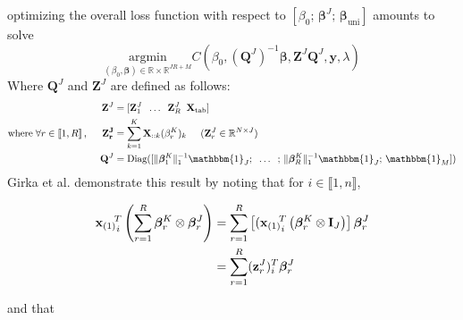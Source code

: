 \documentclass[10pt]{article}
\begin{document}
\noindent optimizing the overall loss function with respect to $\left[ \beta_0;\, \bm{\beta}^J ;\, \bm{\beta}_{\text{uni}}  \right]$ amounts to solve
\begin{equation}
    \underset{(\beta_0, \bm{\beta}) \in \mathbb{R} \times \mathbb{R}^{JR + M}}{\text{argmin}}  C(\beta_0, (\mathbf{Q}^J)^{-1}\bm{\beta},\mathbf{Z}^J \mathbf{Q}^J, \mathbf{y}, \lambda)
\end{equation}
\noindent Where $\mathbf{Q}^J$ and $\mathbf{Z}^J$ are defined as follows:
\begin{align}
    \mathbf{Z}^J                                                                               & = [\mathbf{Z}_1^J \; \; \hdots \; \; \mathbf{Z}_R^J \; \;  \mathbf{X}_{\text{tab}}]                                                                             \\
    \text{where} \; \forall r \in \llbracket 1, R\rrbracket\, , \hspace{0.5 cm} \mathbf{Z_r^J} & = \sum\limits_{k = 1}^K \mathbf{X}_{::k} (\beta_r^K)_k \hspace{0.5 cm} (\mathbf{Z}_r^J \in \mathbb{R}^{N \times J})                                             \\
    \hspace{7 pt}
    \mathbf{Q}^J                                                                               & = \text{Diag}([\lVert \bm{\beta}_1^K \rVert_1^{-1} \mathbbm{1}_J; \; \; \hdots \; \; ;\, \lVert \bm{\beta}_R^K \rVert_1^{-1} \mathbbm{1}_J ;\,  \mathbbm{1}_M])
\end{align}
\hspace{10 pt}
\noindent Girka et al. \cite{multi_rank_r} demonstrate this result by noting that for $i \in \llbracket 1, n\rrbracket$,

\begin{align}
    {{\mathbf{x}_{(1)}}_i}^{\hspace{-5 pt} T} \left( \sum\limits_{r = 1}^R \bm{\beta}_r^K \otimes \bm{\beta}_r^J \right) & = \sum\limits_{r = 1}^R \left[({{\mathbf{x}_{(1)}}_i}^{\hspace{-5 pt} T}   \left( \bm{\beta}_r^K  \otimes \mathbf{I}_J\right)\right] \bm{\beta}_r^J \\
                                                                                                                         & = \sum\limits_{r = 1}^R (\mathbf{z}_r^J)_i^T \bm{\beta}_r^J
\end{align}

\noindent and that
\end{document}
